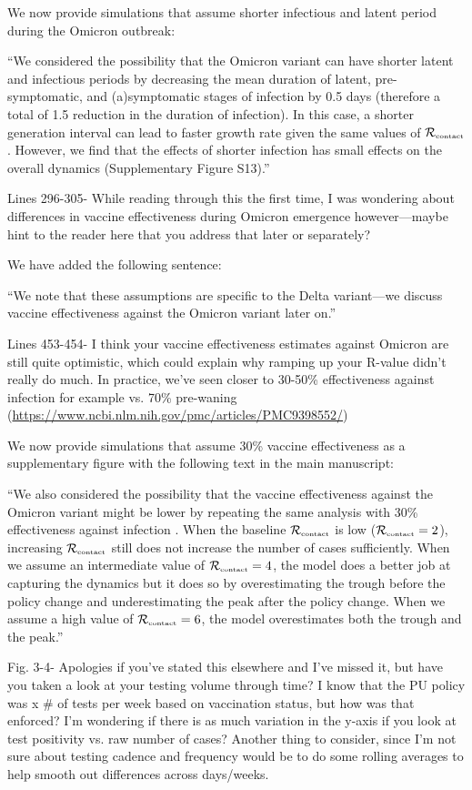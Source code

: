 \documentclass[12pt]{article}
\newcommand{\Rx}[1]{\ensuremath{{\mathcal R}_{#1}}}
\newcommand{\Rc}{\Rx{\textrm{\tiny{contact}}}}
\newcommand{\revtext}{\textsf}
\begin{document}
We now provide simulations that assume shorter infectious and latent period during the Omicron outbreak:

``We considered the possibility that the Omicron variant can have shorter latent and infectious periods by decreasing the mean duration of latent, pre-symptomatic, and (a)symptomatic stages of infection by 0.5 days (therefore a total of 1.5 reduction in the duration of infection).
In this case, a shorter generation interval can lead to faster growth rate given the same values of $\Rc$ \citep{wallinga2007generation}.
However, we find that the effects of shorter infection has small effects on the overall dynamics (Supplementary Figure S13).''

\revtext{Lines 296-305- While reading through this the first time, I was wondering about differences in vaccine effectiveness during Omicron emergence however—maybe hint to the reader here that you address that later or separately?} 

We have added the following sentence: 

``We note that these assumptions are specific to the Delta variant---we discuss vaccine effectiveness against the Omicron variant later on.''

\revtext{Lines 453-454- I think your vaccine effectiveness estimates against Omicron are still quite optimistic, which could explain why ramping up your R-value didn’t really do much. In practice, we’ve seen closer to 30-50\% effectiveness against infection for example vs. 70\% pre-waning (\url{https://www.ncbi.nlm.nih.gov/pmc/articles/PMC9398552/})}

We now provide simulations that assume 30\% vaccine effectiveness as a supplementary figure with the following text in the main manuscript:

``We also considered the possibility that the vaccine effectiveness against the Omicron variant might be lower by repeating the same analysis with 30\% effectiveness against infection \citep{tan2023vaccine}.
When the baseline $\Rc$ is low ($\Rc=2$), increasing $\Rc$ still does not increase the number of cases sufficiently.
When we assume an intermediate value of $\Rc=4$, the model does a better job at capturing the dynamics but it does so by overestimating the trough before the policy change and underestimating the peak after the policy change.
When we assume a high value of $\Rc=6$, the model overestimates both the trough and the peak.''


\revtext{Fig. 3-4- Apologies if you’ve stated this elsewhere and I’ve missed it, but have you taken a look at your testing volume through time? I know that the PU policy was x \# of tests per week based on vaccination status, but how was that enforced? I’m wondering if there is as much variation in the y-axis if you look at test positivity vs. raw number of cases? Another thing to consider, since I’m not sure about testing cadence and frequency would be to do some rolling averages to help smooth out differences across days/weeks.}
\end{document}
